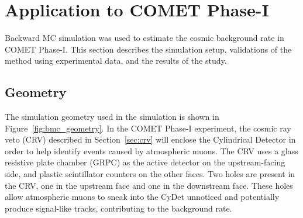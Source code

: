 \section{Application to COMET Phase-I}
Backward MC simulation was used to estimate the cosmic background rate in COMET
Phase\nobreakdash-I. This section describes the simulation setup, validations of the method
using experimental data, and the results of the study.

\subsection{Geometry}
The simulation geometry used in the simulation is shown in
Figure~\ref{fig:bmc_geometry}. In the COMET Phase\nobreakdash-I experiment, the cosmic ray
veto (CRV) described in Section~\ref{sec:crv} will enclose the Cylindrical
Detector in order to help identify events caused by atmospheric muons. The CRV
uses a glass resistive plate chamber (GRPC) as the active detector on the
upstream-facing side, and plastic scintillator counters on the other faces. Two
holes are present in the CRV, one in the upstream face and one in the downstream
face. These holes allow atmospheric muons to sneak into the CyDet unnoticed and
potentially produce signal-like tracks, contributing to the background rate.


